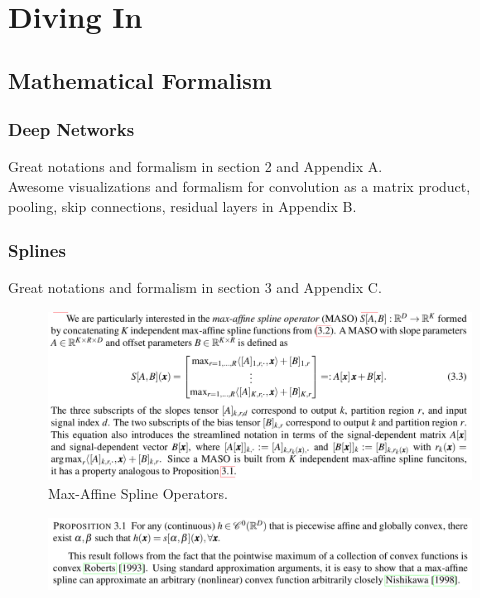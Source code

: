 \documentclass{article}
\begin{document}
\section{Diving In}


\subsection{Mathematical  Formalism}

\subsubsection{Deep Networks}

Great notations and formalism in section 2 and Appendix A.\\
Awesome visualizations and formalism for convolution as a matrix product, pooling, skip connections, residual layers in Appendix B.


\subsubsection{Splines}

Great notations and formalism in section 3 and Appendix C.\\

\begin{figure}[h]
	\begin{center}
		\includegraphics[width=.8\linewidth]{Figure/def_maso}
			\caption{Max-Affine Spline Operators.}
		\label{fig:def_maso}
	\end{center}
\end{figure}

\begin{figure}[h]
\begin{center}
	\includegraphics[width=.8\linewidth]{Figure/prop3p1}
	\label{fig:prop3p1}
\end{center}
\end{figure}
\end{document}
